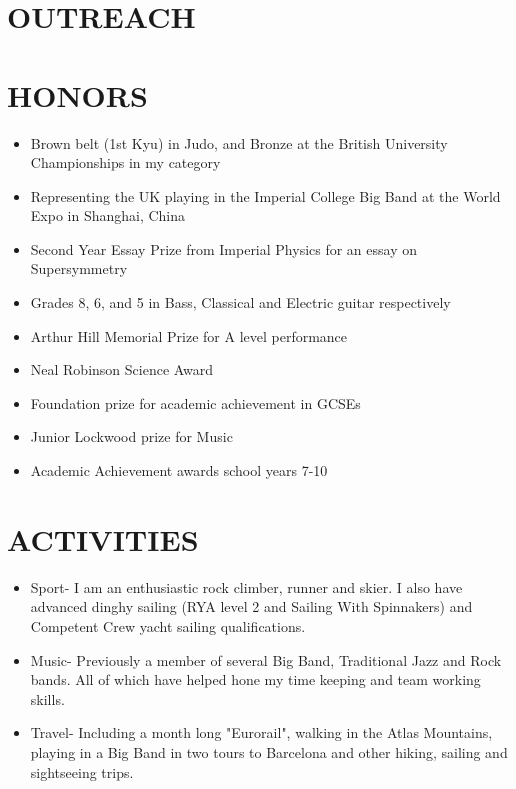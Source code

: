\documentclass[9pt]{res} %
\begin{document}
\begin{resume}
\section{OUTREACH}

\section{HONORS} 
\begin{itemize}
\item Brown belt (1st Kyu) in Judo, and Bronze at the British University Championships in my category
\item Representing the UK playing in the Imperial College Big Band at the World Expo in Shanghai, China
\item Second Year Essay Prize from Imperial Physics for an essay on Supersymmetry
\item Grades 8, 6, and 5 in Bass, Classical and Electric guitar respectively
\item Arthur Hill Memorial Prize for A level performance
\item Neal Robinson Science Award
\item Foundation prize for academic achievement in GCSEs
\item Junior Lockwood prize for Music
\item Academic Achievement awards school years 7-10
\end{itemize}
 
\section{ACTIVITIES} 
\begin{itemize}
\item Sport- I am an enthusiastic rock climber, runner and skier. I also have advanced dinghy sailing (RYA level 2 and Sailing With Spinnakers) and Competent Crew yacht sailing qualifications.
\item Music- Previously a member of several Big Band, Traditional Jazz and Rock bands. All of which have helped hone my time keeping and team working skills.
\item Travel- Including a month long "Eurorail", walking in the Atlas Mountains, playing in a Big Band in two tours to Barcelona and other hiking, sailing and sightseeing trips.
\end{itemize}


\end{resume}
\end{document}
